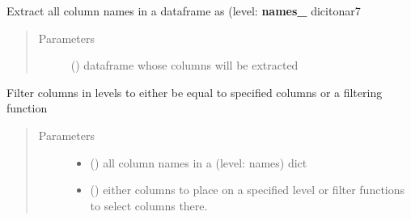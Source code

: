 \documentclass[letterpaper,10pt,english]{sphinxmanual}
\begin{document}
\begin{fulllineitems}
\label{\detokenize{dalio.util:dalio.util.extract_level_names_dict}}
Extract all column names in a dataframe as (level: {\color{red}\bfseries{}names\_} dicitonar7
\begin{quote}\begin{description}
\item[{Parameters}] \leavevmode
{} () \textendash{} dataframe whose columns will be extracted

\end{description}\end{quote}

\end{fulllineitems}


\begin{fulllineitems}
\label{\detokenize{dalio.util:dalio.util.filter_levels}}
Filter columns in levels to either be equal to specified
columns or a filtering function
\begin{quote}\begin{description}
\item[{Parameters}] \leavevmode\begin{itemize}
\item {} 
 () \textendash{} all column names in a (level: names) dict

\item {} 
 (\sphinxstyleliteralemphasis{\sphinxupquote{, }}\sphinxstyleliteralemphasis{\sphinxupquote{, }}\sphinxstyleliteralemphasis{\sphinxupquote{, }}) \textendash{} either columns to place on
a specified level or filter functions to select columns there.

\end{itemize}

\end{description}\end{quote}

\end{fulllineitems}
\end{document}
